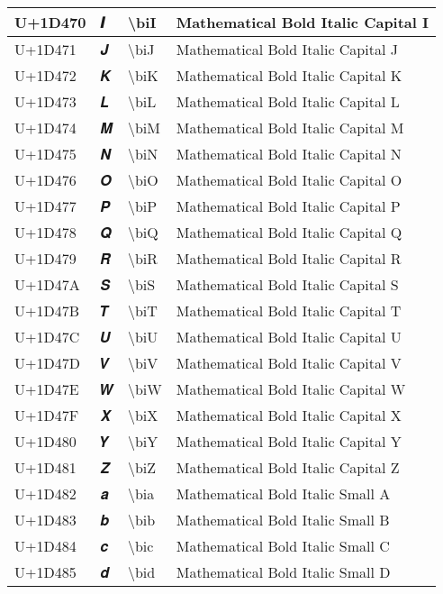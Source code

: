 \begin{table}[h]
\begin{tabulary}{\linewidth}{|L|L|L|L|}
\hline
U+1D470 & 𝑰 & {\textbackslash}biI & Mathematical Bold Italic Capital I \\
\hline
U+1D471 & 𝑱 & {\textbackslash}biJ & Mathematical Bold Italic Capital J \\
\hline
U+1D472 & 𝑲 & {\textbackslash}biK & Mathematical Bold Italic Capital K \\
\hline
U+1D473 & 𝑳 & {\textbackslash}biL & Mathematical Bold Italic Capital L \\
\hline
U+1D474 & 𝑴 & {\textbackslash}biM & Mathematical Bold Italic Capital M \\
\hline
U+1D475 & 𝑵 & {\textbackslash}biN & Mathematical Bold Italic Capital N \\
\hline
U+1D476 & 𝑶 & {\textbackslash}biO & Mathematical Bold Italic Capital O \\
\hline
U+1D477 & 𝑷 & {\textbackslash}biP & Mathematical Bold Italic Capital P \\
\hline
U+1D478 & 𝑸 & {\textbackslash}biQ & Mathematical Bold Italic Capital Q \\
\hline
U+1D479 & 𝑹 & {\textbackslash}biR & Mathematical Bold Italic Capital R \\
\hline
U+1D47A & 𝑺 & {\textbackslash}biS & Mathematical Bold Italic Capital S \\
\hline
U+1D47B & 𝑻 & {\textbackslash}biT & Mathematical Bold Italic Capital T \\
\hline
U+1D47C & 𝑼 & {\textbackslash}biU & Mathematical Bold Italic Capital U \\
\hline
U+1D47D & 𝑽 & {\textbackslash}biV & Mathematical Bold Italic Capital V \\
\hline
U+1D47E & 𝑾 & {\textbackslash}biW & Mathematical Bold Italic Capital W \\
\hline
U+1D47F & 𝑿 & {\textbackslash}biX & Mathematical Bold Italic Capital X \\
\hline
U+1D480 & 𝒀 & {\textbackslash}biY & Mathematical Bold Italic Capital Y \\
\hline
U+1D481 & 𝒁 & {\textbackslash}biZ & Mathematical Bold Italic Capital Z \\
\hline
U+1D482 & 𝒂 & {\textbackslash}bia & Mathematical Bold Italic Small A \\
\hline
U+1D483 & 𝒃 & {\textbackslash}bib & Mathematical Bold Italic Small B \\
\hline
U+1D484 & 𝒄 & {\textbackslash}bic & Mathematical Bold Italic Small C \\
\hline
U+1D485 & 𝒅 & {\textbackslash}bid & Mathematical Bold Italic Small D \\

\end{tabulary}
\end{table}
